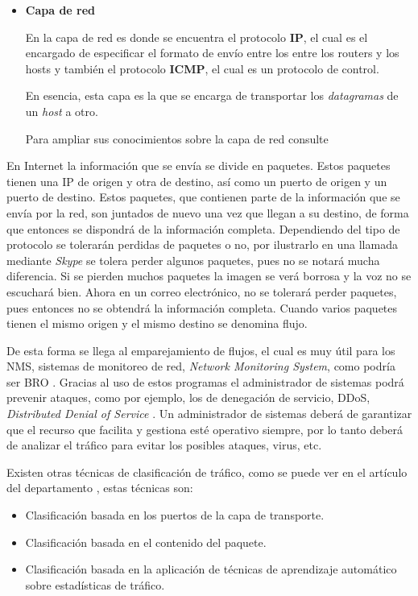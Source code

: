 \begin{itemize}
\item \textbf{Capa de red}

En la capa de red es donde se encuentra el protocolo \textbf{IP}, el cual es el encargado de especificar 
el formato de envío entre los entre los routers y los hosts y también el protocolo \textbf{ICMP}, el cual 
es un protocolo de control.

\intro En esencia, esta capa es la que se encarga de transportar los \textit{datagramas} de un \textit{host} a otro.

\intro Para ampliar sus conocimientos sobre la capa de red consulte \cite{redes2010d}

\end{itemize}

\intro En Internet la información que se envía se divide en paquetes. Estos paquetes tienen una IP de 
origen y otra de destino, así como un puerto de origen y un puerto de destino. Estos paquetes, que contienen 
parte de la información que se envía por la red, son juntados de nuevo una vez que llegan a su destino, de forma 
que entonces se dispondrá de la información completa. Dependiendo del tipo de protocolo se tolerarán perdidas 
de paquetes o no, por ilustrarlo en una llamada mediante \textit{Skype} se tolera perder algunos paquetes, 
pues no se notará mucha diferencia. Si se pierden muchos paquetes la imagen se verá borrosa 
y la voz no se escuchará bien. Ahora en un correo electrónico, no se tolerará perder paquetes, 
pues entonces no se obtendrá la información completa. Cuando varios paquetes tienen el mismo origen y 
el mismo destino se denomina flujo. \cite{redes2010a}

\intro De esta forma se llega al emparejamiento de flujos, el cual es muy útil para los NMS, 
sistemas de monitoreo de red, \textit{Network Monitoring System}, como podría ser BRO \cite{broindex}.
Gracias al uso de estos programas el administrador de sistemas podrá prevenir ataques, como por ejemplo, los 
de denegación de servicio, DDoS, \textit{Distributed Denial of Service} \cite{redes2010e}. Un administrador 
de sistemas deberá de garantizar que el recurso que facilita y gestiona esté operativo siempre, 
por lo tanto deberá de analizar el tráfico para evitar los posibles ataques, virus, etc.

\intro Existen otras técnicas de clasificación de tráfico, como se puede ver en el artículo del 
departamento \citep{comparacion}, estas técnicas son: 

\begin{itemize}
\item Clasificación basada en los puertos de la capa de transporte. \cite{iana}
\item Clasificación basada en el contenido del paquete. \cite{payload}
\item Clasificación basada en la aplicación de técnicas de aprendizaje automático sobre estadísticas 
de tráfico. \cite{learning}
\end{itemize}

